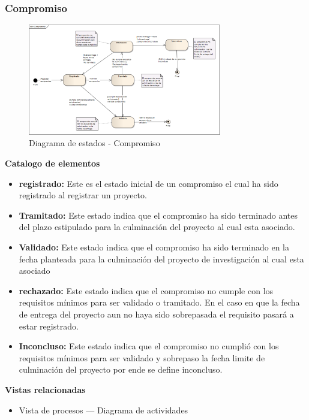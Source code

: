 \documentclass[12pt,oneside,letterpaper]{report}
\begin{document}
\subsubsection{Compromiso}

\begin{figure}[h!]
  \centering
    \includegraphics[width=0.75\textwidth]{./img/img21.png}
  \caption{Diagrama de estados - Compromiso}
\end{figure}

\textbf{Catalogo de elementos}
\begin{itemize}
 \item \textbf{registrado:} Este es el estado inicial de un compromiso  el cual ha sido registrado al registrar un proyecto.
 \item \textbf{Tramitado:} Este estado indica que el compromiso ha sido terminado antes del plazo estipulado para la culminación del proyecto al cual esta asociado.
 \item \textbf{Validado:} Este estado indica que el compromiso ha sido terminado en la fecha planteada para la culminación del proyecto de investigación al cual esta asociado
 \item \textbf{rechazado:} Este estado indica que el compromiso no cumple con los requisitos mínimos para ser validado o tramitado. En el caso en que la fecha de entrega del proyecto aun no haya sido sobrepasada el requisito pasará a estar registrado.
 \item \textbf{Inconcluso:} Este estado indica que el compromiso no cumplió con los requisitos mínimos para ser validado y sobrepaso la fecha limite de culminación del proyecto por ende se define inconcluso.
\end{itemize}





\textbf{Vistas relacionadas}
\begin{itemize}
 \item Vista de procesos --- Diagrama de actividades
\end{itemize}
\end{document}
